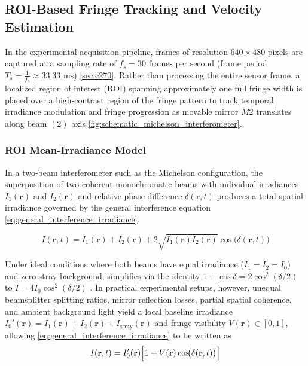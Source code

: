 \subsection{ROI-Based Fringe Tracking and Velocity Estimation}
\label{sec:roi_fringe_velocity}

In the experimental acquisition pipeline, frames of resolution $640 \times 480\text{ pixels}$ are captured at a sampling rate of $f_s = 30\text{ frames per second}$ (frame period $T_s = \frac{1}{f_s} \approx 33.33\text{ ms}$) \cref{sec:c270}. Rather than processing the entire sensor frame, a localized region of interest ($\text{ROI}$) spanning approximately one full fringe width is placed over a high-contrast region of the fringe pattern to track temporal irradiance modulation and fringe progression as movable mirror $M2$ translates along beam $(2)$ axis \cref{fig:schematic_michelson_interferometer}.



\subsubsection{ROI Mean-Irradiance Model}
\label{sec:roi_model_validity}

In a two-beam interferometer such as the Michelson configuration, the superposition of two coherent monochromatic beams with individual irradiances $I_1(\mathbf{r})$ and $I_2(\mathbf{r})$ and relative phase difference $\delta(\mathbf{r}, t)$ produces a total spatial irradiance governed by the general interference equation \cref{eq:general_interference_irradiance}.


\begin{equation}
    I(\mathbf{r}, t) = I_1(\mathbf{r}) + I_2(\mathbf{r}) + 2\sqrt{I_1(\mathbf{r}) I_2(\mathbf{r})}\cos\!\bigl(\delta(\mathbf{r}, t)\bigr)
    \label{eq:general_interference_irradiance}
\end{equation}


Under ideal conditions where both beams have equal irradiance ($I_1 = I_2 = I_0$) and zero stray background, simplifies via the identity $1 + \cos\delta = 2\cos^2(\delta/2)$ to $I = 4I_0\cos^2(\delta/2)$ \cite{pedrottiIntroductionOptics2007, hechtOptics2017}. In practical experimental setups, however, unequal beamsplitter splitting ratios, mirror reflection losses, partial spatial coherence, and ambient background light yield a local baseline irradiance $I_0'(\mathbf{r}) = I_1(\mathbf{r}) + I_2(\mathbf{r}) + I_{\text{stray}}(\mathbf{r})$ and fringe visibility $V(\mathbf{r}) \in [0, 1]$, allowing \cref{eq:general_interference_irradiance} to be written as
\begin{equation}
    I(\mathbf{r}, t) = I_0'(\mathbf{r})\Bigl[1 + V(\mathbf{r})\cos\!\bigl(\delta(\mathbf{r}, t)\bigr)\Bigr]
    \label{eq:visibility_irradiance}
\end{equation}

